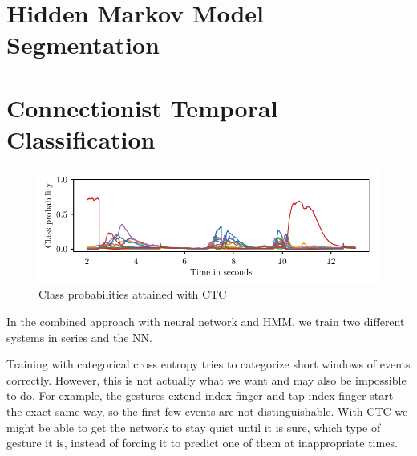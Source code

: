 

\begin{figure}[h]
  \centering
  \caption{}
  \label{fig:}
\end{figure}

\section{Hidden Markov Model Segmentation}
\label{sec:hmm-segmentation}



\section{Connectionist Temporal Classification}
\label{sec:ctc}

\begin{figure}[h]
  \centering
  \includegraphics{figures/methods/ctc}
  \caption{Class probabilities attained with CTC}
  \label{fig:ctc-p}
\end{figure}

In the combined approach with neural network and HMM, we train two different
systems in series and the NN.

Training with categorical cross entropy tries to categorize short windows of events correctly.
However, this is not actually what we want and may also be impossible to do.
For example, the gestures extend-index-finger and tap-index-finger start the exact same way, so the first few events are not distinguishable.
With CTC we might be able to get the network to stay quiet until it is sure, which type of gesture it is, instead of forcing it to predict one of them at inappropriate times.


